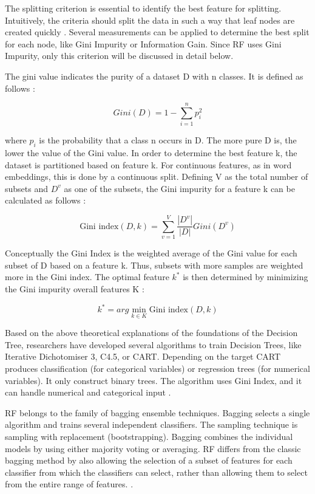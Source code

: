 \documentclass[12pt, a4paper, titlepage]{article}
\begin{document}
The splitting criterion is essential to identify the best feature for splitting. Intuitively, the criteria should split the data in such a way that leaf nodes are created quickly \citep{Berthold2020}. Several measurements can be applied to determine the best split for each node, like Gini Impurity or Information Gain. Since \ac{RF} uses Gini Impurity, only this criterion will be discussed in detail below. 

The gini value indicates the purity of a dataset D with n classes. It is defined as follows \citep[3156]{yuan2021}: 

\[Gini(D) = 1 - \sum_{i=1}^n p^2_i\]

where $p_i$ is the probability that a class n occurs in D. The more pure D is, the lower the value of the Gini value. In order to determine the best feature k, the dataset is partitioned based on feature k. For continuous features, as in word embeddings, this is done by a continuous split. Defining V as the total number of subsets and $D^v$ as one of the subsets, the Gini impurity for a feature k can be calculated as follows \cite{yuan2021}: 

\[\text{Gini index}(D,k) = \sum_{v=1}^V \frac{|D^v|}{|D|} Gini(D^v) \]

Conceptually the Gini Index is the weighted average of the Gini value for each subset of D based on a feature k. Thus, subsets with more samples are weighted more in the Gini index. The optimal feature $k^*$ is then determined by minimizing the Gini impurity overall features K \citep[3156]{yuan2021}: 

\[ k^* = arg \min_{k \in K} \text{Gini index} (D,k) \]

Based on the above theoretical explanations of the foundations of the Decision Tree, researchers have developed several algorithms to train Decision Trees, like Iterative Dichotomiser 3, C4.5, or \ac{CART}. Depending on the target \ac{CART} produces classification (for categorical variables) or regression trees (for numerical variables). It only construct binary trees. The algorithm uses Gini Index, and it can handle numerical and categorical input \citep{brijain2014}.

\ac{RF} belongs to the family of bagging ensemble techniques.
Bagging selects a single algorithm and trains several independent classifiers. The sampling technique is sampling with replacement (bootstrapping). Bagging combines the individual models by using either majority voting or averaging. \ac{RF} differs from the classic bagging method by also allowing the selection of a subset of features for each classifier from which the classifiers can select, rather than allowing them to select from the entire range of features. \citep{polikar2012, zhou2009, Berthold2020}. 
\end{document}
